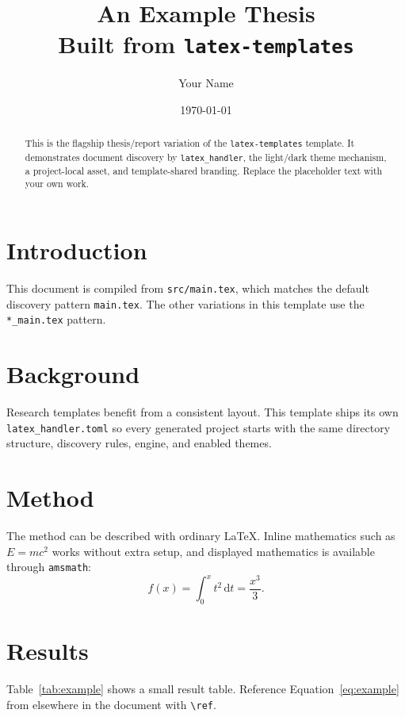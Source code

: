 \documentclass[11pt,a4paper]{report}
\title{An Example Thesis\\[0.4em]\large Built from \texttt{latex-templates}}
\author{Your Name}
\date{\today}
\providecommand{\lhbar}{}
\begin{document}
\maketitle
\lhbar

\begin{abstract}
This is the flagship thesis/report variation of the \texttt{latex-templates}
template. It demonstrates document discovery by \texttt{latex\_handler}, the
light/dark theme mechanism, a project-local asset, and template-shared
branding. Replace the placeholder text with your own work.
\end{abstract}

\tableofcontents
\clearpage

\chapter{Introduction}
This document is compiled from \texttt{src/main.tex}, which matches the default
discovery pattern \texttt{main.tex}. The other variations in this template use
the \texttt{*\_main.tex} pattern.



\chapter{Background}
Research templates benefit from a consistent layout. This template ships its
own \texttt{latex\_handler.toml} so every generated project starts with the
same directory structure, discovery rules, engine, and enabled themes.

\chapter{Method}
The method can be described with ordinary LaTeX. Inline mathematics such as
$E = mc^2$ works without extra setup, and displayed mathematics is available
through \texttt{amsmath}:
\begin{equation}
  \label{eq:example}
  f(x) = \int_0^x t^2 \, \mathrm{d}t = \frac{x^3}{3}.
\end{equation}

\chapter{Results}
Table~\ref{tab:example} shows a small result table. Reference
Equation~\ref{eq:example} from elsewhere in the document with
\texttt{\textbackslash ref}.
\end{document}
